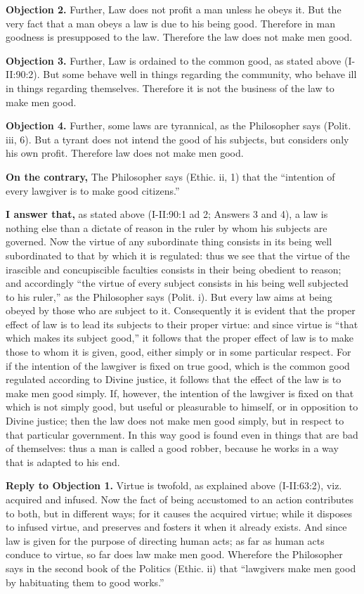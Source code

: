 \textbf{Objection 2.} Further, Law does not profit a man unless he obeys it. But the very fact that a man obeys a law is due to his being good. Therefore in man goodness is presupposed to the law. Therefore the law does not make men good.

\textbf{Objection 3.} Further, Law is ordained to the common good, as stated above (I-II:90:2). But some behave well in things regarding the community, who behave ill in things regarding themselves. Therefore it is not the business of the law to make men good.

\textbf{Objection 4.} Further, some laws are tyrannical, as the Philosopher says (Polit. iii, 6). But a tyrant does not intend the good of his subjects, but considers only his own profit. Therefore law does not make men good.

\textbf{On the contrary,} The Philosopher says (Ethic. ii, 1) that the ``intention of every lawgiver is to make good citizens.''

\textbf{I answer that,} as stated above (I-II:90:1 ad 2; Answers 3 and 4), a law is nothing else than a dictate of reason in the ruler by whom his subjects are governed. Now the virtue of any subordinate thing consists in its being well subordinated to that by which it is regulated: thus we see that the virtue of the irascible and concupiscible faculties consists in their being obedient to reason; and accordingly ``the virtue of every subject consists in his being well subjected to his ruler,'' as the Philosopher says (Polit. i). But every law aims at being obeyed by those who are subject to it. Consequently it is evident that the proper effect of law is to lead its subjects to their proper virtue: and since virtue is ``that which makes its subject good,'' it follows that the proper effect of law is to make those to whom it is given, good, either simply or in some particular respect. For if the intention of the lawgiver is fixed on true good, which is the common good regulated according to Divine justice, it follows that the effect of the law is to make men good simply. If, however, the intention of the lawgiver is fixed on that which is not simply good, but useful or pleasurable to himself, or in opposition to Divine justice; then the law does not make men good simply, but in respect to that particular government. In this way good is found even in things that are bad of themselves: thus a man is called a good robber, because he works in a way that is adapted to his end.

\textbf{Reply to Objection 1.} Virtue is twofold, as explained above (I-II:63:2), viz. acquired and infused. Now the fact of being accustomed to an action contributes to both, but in different ways; for it causes the acquired virtue; while it disposes to infused virtue, and preserves and fosters it when it already exists. And since law is given for the purpose of directing human acts; as far as human acts conduce to virtue, so far does law make men good. Wherefore the Philosopher says in the second book of the Politics (Ethic. ii) that ``lawgivers make men good by habituating them to good works.''

